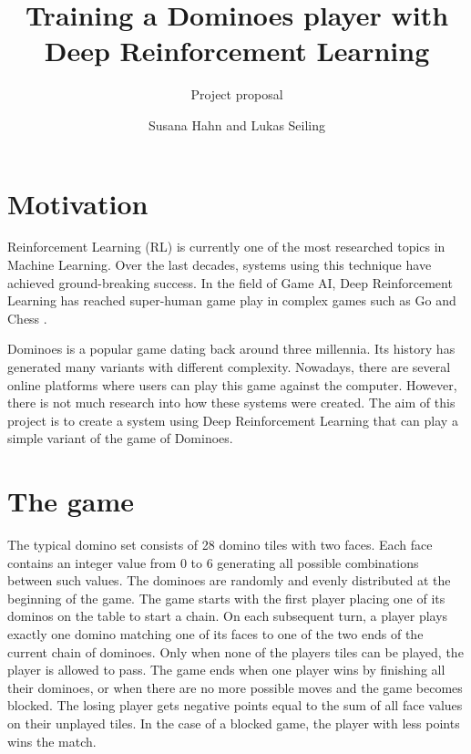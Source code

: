 \documentclass{llncs}
\begin{document}
\title{Training a Dominoes player with Deep Reinforcement Learning}
\subtitle{Project proposal}
\author{Susana Hahn and Lukas Seiling}
\maketitle

\section{Motivation}

Reinforcement Learning (RL) is currently one of the most researched topics in Machine Learning. Over the last decades, systems using this technique have achieved ground-breaking success. In the field of Game AI, Deep Reinforcement Learning has reached super-human game play in complex games such as Go and Chess \cite{alphago}. 

Dominoes is a popular game dating back around three millennia. Its history has generated many variants with different complexity. Nowadays, there are several online platforms where users can play this game against the computer. However, there is not much research into how these systems were created. The aim of this project is to create a system using Deep Reinforcement Learning that can play a simple variant of the game of Dominoes.

\section{The game}

The typical domino set consists of 28 domino tiles with two faces. Each face contains an integer value from 0 to 6 generating all possible combinations between such values. The dominoes are randomly and evenly distributed at the beginning of the game. The game starts with the first player placing one of its dominos on the table to start a chain. On each subsequent turn, a player plays exactly one domino matching one of its faces to one of the two ends of the current chain of dominoes. Only when none of the players tiles can be played, the player is allowed to pass. The game ends when one player wins by finishing all their dominoes, or when there are no more possible moves and the game becomes blocked. The losing player gets negative points equal to the sum of all face values on their unplayed tiles. In the case of a blocked game, the player with less points wins the match. 
\end{document}
